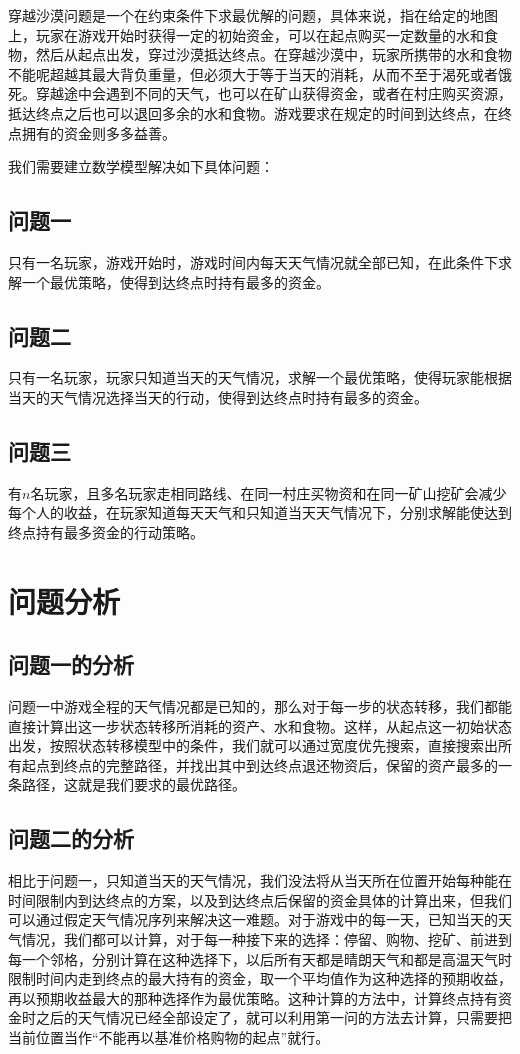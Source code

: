 \documentclass[withoutpreface,bwprint]{cumcmthesis} %
\begin{document}
穿越沙漠问题是一个在约束条件下求最优解的问题，具体来说，指在给定的地图上，玩家在游戏开始时获得一定的初始资金，可以在起点购买一定数量的水和食物，然后从起点出发，穿过沙漠抵达终点。在穿越沙漠中，玩家所携带的水和食物不能呢超越其最大背负重量，但必须大于等于当天的消耗，从而不至于渴死或者饿死。穿越途中会遇到不同的天气，也可以在矿山获得资金，或者在村庄购买资源，抵达终点之后也可以退回多余的水和食物。游戏要求在规定的时间到达终点，在终点拥有的资金则多多益善。

我们需要建立数学模型解决如下具体问题：

\subsection{问题一}
只有一名玩家，游戏开始时，游戏时间内每天天气情况就全部已知，在此条件下求解一个最优策略，使得到达终点时持有最多的资金。

\subsection{问题二}
只有一名玩家，玩家只知道当天的天气情况，求解一个最优策略，使得玩家能根据当天的天气情况选择当天的行动，使得到达终点时持有最多的资金。

\subsection{问题三}
有$n$名玩家，且多名玩家走相同路线、在同一村庄买物资和在同一矿山挖矿会减少每个人的收益，在玩家知道每天天气和只知道当天天气情况下，分别求解能使达到终点持有最多资金的行动策略。


\section{问题分析}

\subsection{问题一的分析}
问题一中游戏全程的天气情况都是已知的，那么对于每一步的状态转移，我们都能直接计算出这一步状态转移所消耗的资产、水和食物。这样，从起点这一初始状态出发，按照状态转移模型中的条件，我们就可以通过宽度优先搜索，直接搜索出所有起点到终点的完整路径，并找出其中到达终点退还物资后，保留的资产最多的一条路径，这就是我们要求的最优路径。

\subsection{问题二的分析}
相比于问题一，只知道当天的天气情况，我们没法将从当天所在位置开始每种能在时间限制内到达终点的方案，以及到达终点后保留的资金具体的计算出来，但我们可以通过假定天气情况序列来解决这一难题。对于游戏中的每一天，已知当天的天气情况，我们都可以计算，对于每一种接下来的选择：停留、购物、挖矿、前进到每一个邻格，分别计算在这种选择下，以后所有天都是晴朗天气和都是高温天气时限制时间内走到终点的最大持有的资金，取一个平均值作为这种选择的预期收益，再以预期收益最大的那种选择作为最优策略。这种计算的方法中，计算终点持有资金时之后的天气情况已经全部设定了，就可以利用第一问的方法去计算，只需要把当前位置当作“不能再以基准价格购物的起点”就行。
\end{document}
